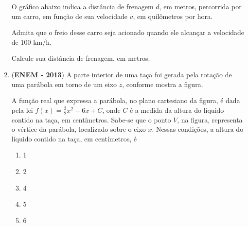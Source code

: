 \begin{enumerate}
O gráfico abaixo indica a distância de frenagem \(d\), em metros, percorrida por um carro, em função de sua velocidade \(v\), em quilômetros por hora.

Admita que o freio desse carro seja acionado quando ele alcançar a velocidade de \(100\) km/h.

Calcule sua distância de frenagem, em metros.


\clearpage
\item (\textbf{ENEM - 2013}) A parte interior de uma taça foi gerada pela rotação de uma parábola em torno de um eixo \(z\), conforme mostra a figura.

\begin{figure}[H]
\centering

\end{figure}

A função real que expressa a parábola, no plano cartesiano da figura, é dada pela lei \(\displaystyle f(x)=\frac{3}{2}x^2-6x+C\), onde \(C\) é a medida da altura do líquido contido na taça, em centímetros. Sabe-se que o ponto \(V\), na figura, representa o vértice da parábola, localizado sobre o eixo \(x\).
Nessas condições, a altura do líquido contido na taça, em centímetros, é
\begin{enumerate}
\item 1
\item 2
\item 4
\item 5
\item 6
\end{enumerate}


\end{enumerate}
